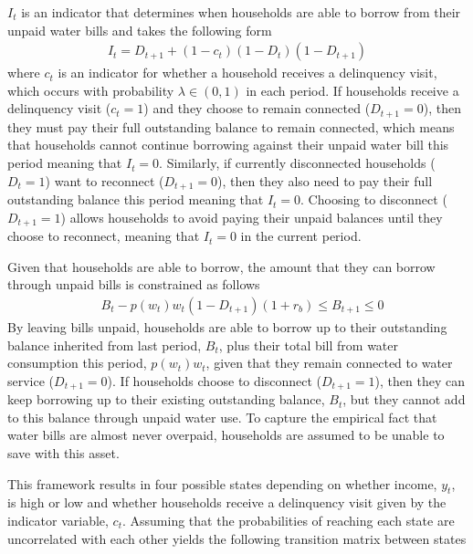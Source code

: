 \documentclass[12pt]{article}
\begin{document}
$I_t$ is an indicator that determines when households are able to borrow from their unpaid water bills and takes the following form
\begin{align}
I_t = D_{t+1} + (1-c_t) (1-D_t) (1-D_{t+1})
\end{align} %
where $c_t$ is an indicator for whether a household receives a delinquency visit, which occurs with probability $\lambda \in (0,1)$ in each period.  If households receive a delinquency visit ($c_t=1$) and they choose to remain connected ($D_{t+1}=0$), then they must pay their full outstanding balance to remain connected, which means that households cannot continue borrowing against their unpaid water bill this period meaning that $I_t=0$.  Similarly, if currently disconnected households ($D_t=1$) want to reconnect ($D_{t+1}=0$), then they also need to pay their full outstanding balance this period meaning that $I_t=0$.  Choosing to disconnect ($D_{t+1}=1$) allows households to avoid paying their unpaid balances until they choose to reconnect, meaning that $I_t=0$ in the current period.  

Given that households are able to borrow, the amount that they can borrow through unpaid bills is constrained as follows
\begin{align}\label{eq:borrowconstraint}
&B_t -  p(w_t) w_t (1-D_{t+1})(1+r_b) \leq B_{t+1} \leq 0 
\end{align}
By leaving bills unpaid, households are able to borrow up to their outstanding balance inherited from last period, $B_t$, plus their total bill from water consumption this period, $p(w_t) w_t$, given that they remain connected to water service ($D_{t+1}=0$).  If households choose to disconnect ($D_{t+1}=1$), then they can keep borrowing up to their existing outstanding balance, $B_t$, but they cannot add to this balance through unpaid water use.  To capture the empirical fact that water bills are almost never overpaid, households are assumed to be unable to save with this asset.

This framework results in four possible states depending on whether income, $y_t$, is high or low and whether households receive a delinquency visit given by the indicator variable, $c_t$.  Assuming that the probabilities of reaching each state are uncorrelated with each other yields the following transition matrix between states
\end{document}
